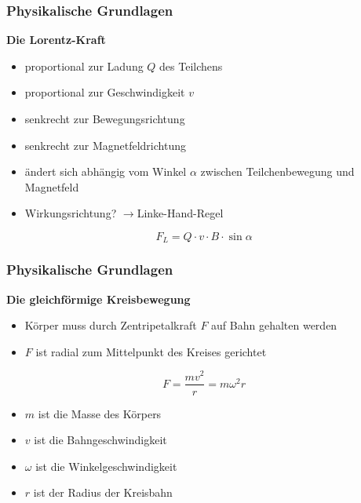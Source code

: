 \mode*
\begin{frame}
  \frametitle{Physikalische Grundlagen}
  \textbf{Die Lorentz-Kraft}
  \begin{itemize}
    \item proportional zur Ladung \(Q\) des Teilchens
    \item proportional zur Geschwindigkeit \(v\)
    \item senkrecht zur Bewegungsrichtung
    \item senkrecht zur Magnetfeldrichtung
    \item \"andert sich abh\"angig vom Winkel \(\alpha\) zwischen Teilchenbewegung und Magnetfeld
    \item Wirkungsrichtung? \(\rightarrow\)Linke-Hand-Regel
  \end{itemize}
  \vspace*{\fill}
  \begin{equation*}
    \label{eq:lorentz_abs}
    F_L = Q \cdot v \cdot B \cdot \sin{\alpha}
  \end{equation*}
  \vspace*{\fill}
\end{frame}

\begin{frame}
  \frametitle{Physikalische Grundlagen}
  \textbf{Die gleichf\"ormige Kreisbewegung}
  \begin{itemize}
    \item K\"orper muss durch Zentripetalkraft \(F\) auf Bahn gehalten werden
    \item \(F\) ist radial zum Mittelpunkt des Kreises gerichtet
  \end{itemize}
  \vspace*{\fill}
  \begin{equation*}
    \label{eq:zentripetalkraft}
    F = \frac{mv^2}{r} = m\omega^2r
  \end{equation*}
  \vspace*{\fill}
  \begin{itemize}
    \item \(m\) ist die Masse des K\"orpers
    \item \(v\) ist die Bahngeschwindigkeit
    \item \(\omega\) ist die Winkelgeschwindigkeit
    \item \(r\) ist der Radius der Kreisbahn
  \end{itemize}
\end{frame}

